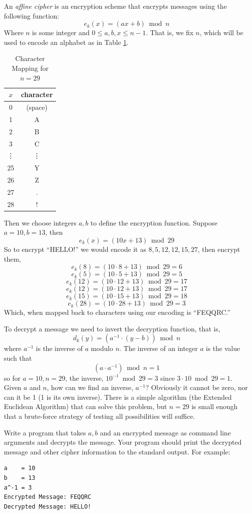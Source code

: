 \begin{exer}
An \emph{affine cipher} is an encryption scheme that encrypts
messages using the following function:
  $$e_k(x) = (a x + b) \bmod{n}$$
Where $n$ is some integer and $0\leq a, b, x \leq n-1$.  That is, we fix
$n$, which will be used to encode an alphabet as in Table \ref{table:characterMapping}.

\begin{table}[h]
\centering
\begin{tabular}{c|c}
$x$ & character \\
\hline\hline
0 & (space) \\
1 & A \\
2 & B \\
3 & C \\
\vdots & \vdots \\
25 & Y \\
26 & Z \\
27 & .\\
28 & !\\
\end{tabular}
\caption{Character Mapping for $n = 29$}
\label{table:characterMapping}
\end{table}

Then we choose integers $a, b$ to define the encryption function.  Suppose
$a = 10, b = 13$, then 
  $$e_k(x) = (10x + 13) \bmod{29}$$
So to encrypt ``HELLO!'' we would encode it as $8, 5, 12, 12, 15, 27$, then encrypt
them, 
  $$e_k(8) = (10 \cdot 8 + 13) \bmod{29} = 6$$
  $$e_k(5) = (10 \cdot 5 + 13) \bmod{29} = 5$$
  $$e_k(12) = (10 \cdot 12 + 13) \bmod{29} = 17$$
  $$e_k(12) = (10 \cdot 12 + 13) \bmod{29} = 17$$
  $$e_k(15) = (10 \cdot 15 + 13) \bmod{29} = 18$$
  $$e_k(28) = (10 \cdot 28 + 13) \bmod{29} = 3$$
Which, when mapped back to characters using our encoding is ``FEQQRC.''

To decrypt a message we need to invert the decryption function, that is, 
  $$d_k(y) = \left( a^{-1} \cdot (y-b) \right) \bmod{n}$$
where $a^{-1}$ is the inverse of $a$ modulo $n$.  The inverse of an integer
$a$ is the value such that 
  $$(a \cdot a^{-1}) \bmod{n} = 1$$
so for $a = 10, n = 29$, the inverse, $10^{-1} \bmod{29} = 3$ since $3 \cdot 10 \bmod{29} = 1$.
Given $a$ and $n$, how can we find an inverse, $a^{-1}$?  Obviously it cannot be
zero, nor can it be 1 (1 is its own inverse).  There is a simple algorithm (the Extended Euclidean
Algorithm) that can solve this problem, but $n = 29$ is small enough that a brute-force
strategy of testing all possibilities will suffice.

Write a program that takes $a, b$ and an encrypted message as command 
line arguments and decrypts the message.  Your program should print the
decrypted message and other cipher information to the standard output.  For
example:

\begin{verbatim}
a    = 10
b    = 13
a^-1 = 3
Encrypted Message: FEQQRC
Decrypted Message: HELLO!
\end{verbatim}
\end{exer}

